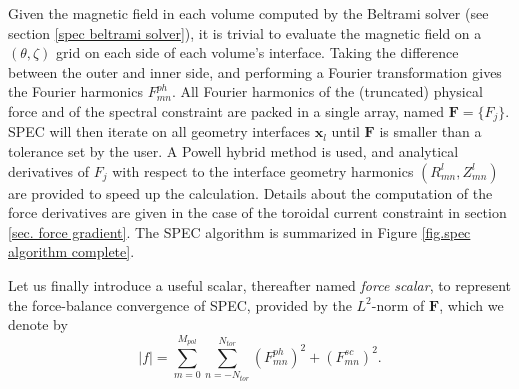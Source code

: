 \documentclass[my_thesis.tex]{subfiles}
\begin{document}
Given the magnetic field in each volume computed by the Beltrami solver (see section \ref{spec beltrami solver}), it is trivial to evaluate the magnetic field on a $(\theta,\zeta)$ grid on each side of each volume's interface. Taking the difference between the outer and inner side, and performing a Fourier transformation gives the Fourier harmonics $F^{ph}_{mn}$. All Fourier harmonics of the (truncated) physical force and of the spectral constraint are packed in a single array, named $\mathbf{F}=\{F_j\}$. SPEC will then iterate on all geometry interfaces $\mathbf{x}_l$ until $\mathbf{F}$ is smaller than a tolerance set by the user. A Powell hybrid method is used, and analytical derivatives of $F_j$ with respect to the interface geometry harmonics $(R_{mn}^l, Z_{mn}^l)$ are provided to speed up the calculation. Details about the computation of the force derivatives are given in the case of the toroidal current constraint in section \ref{sec. force gradient}. The SPEC algorithm is summarized in Figure \ref{fig.spec algorithm complete}. 

Let us finally introduce a useful scalar, thereafter named \emph{force scalar}, to represent the force-balance convergence of SPEC, provided by the $L^2$-norm of $\mathbf{F}$, which we denote by
\begin{equation}
	|f| = \sum_{m=0}^{M_{pol}}\sum_{n=-N_{tor}}^{N_{tor}} (F^{ph}_{mn})^2+(F^{sc}_{mn})^2. \label{eq. l2-norm of the force in spec}
\end{equation}
\end{document}
